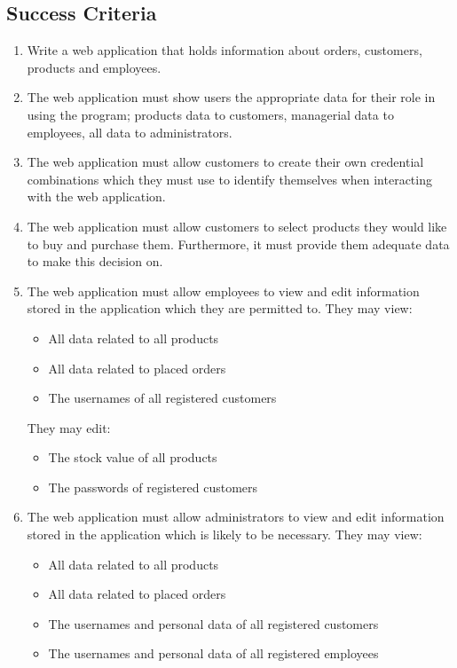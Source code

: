﻿\documentclass{article}
\begin{document}
    \subsection{Success Criteria}
    \begin{enumerate}
    \item Write a web application that holds information about orders, customers, products and employees. 
    \item The web application must show users the appropriate data for their role in using the program; products data to customers, managerial data to employees, all data to administrators.
    \item The web application must allow customers to create their own credential combinations which they must use to identify themselves when interacting with the web application.
    \item The web application must allow customers to select products they would like to buy and purchase them. 
    Furthermore, it must provide them adequate data to make this decision on. 
    \item The web application must allow employees to view and edit information stored in the application which they are permitted to. They may view:
    \begin{itemize}
    \item All data related to all products
    \item All data related to placed orders
    \item The usernames of all registered customers
    \end{itemize}
    They may edit: 
    \begin{itemize}
    \item The stock value of all products
    \item The passwords of registered customers
    \end{itemize}
    \item The web application must allow administrators to view and edit information stored in the application which is likely to be necessary. They may view:
    \begin{itemize}
    \item All data related to all products
    \item All data related to placed orders
    \item The usernames and personal data of all registered customers
    \item The usernames and personal data of all registered employees

\end{itemize}
\end{enumerate}
\end{document}
